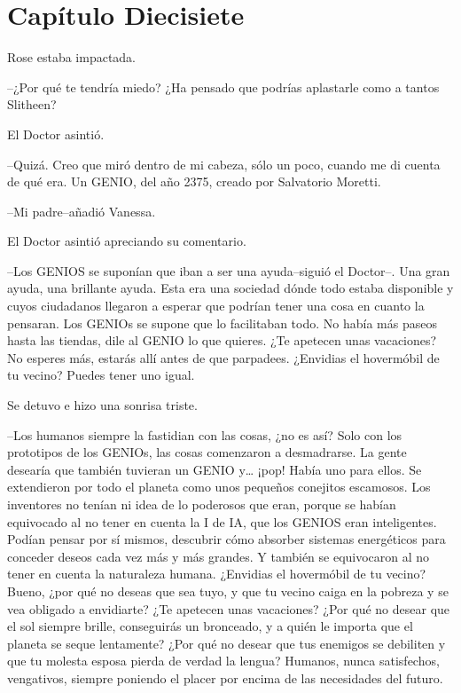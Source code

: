 \chapter*{Capítulo Diecisiete}

Rose estaba impactada.

--¿Por qué te tendría miedo? ¿Ha pensado que podrías aplastarle como a
tantos Slitheen?

El Doctor asintió.

--Quizá. Creo que miró dentro de mi cabeza, sólo un poco, cuando me di
cuenta de qué era. Un GENIO, del año 2375, creado por Salvatorio
Moretti.

--Mi padre--añadió Vanessa.

El Doctor asintió apreciando su comentario.

--Los GENIOS se suponían que iban a ser una ayuda--siguió el Doctor--.
Una gran ayuda, una brillante ayuda. Esta era una sociedad dónde todo
estaba disponible y cuyos ciudadanos llegaron a esperar que podrían
tener una cosa en cuanto la pensaran. Los GENIOs se supone que lo
facilitaban todo. No había más paseos hasta las tiendas, dile al GENIO
lo que quieres. ¿Te apetecen unas vacaciones? No esperes más, estarás
allí antes de que parpadees. ¿Envidias el hovermóbil de tu vecino?
Puedes tener uno igual.

Se detuvo e hizo una sonrisa triste.

--Los humanos siempre la fastidian con las cosas, ¿no es así? Solo con
los prototipos de los GENIOs, las cosas comenzaron a desmadrarse. La
gente desearía que también tuvieran un GENIO y\ldots{} ¡pop! Había uno
para ellos. Se extendieron por todo el planeta como unos pequeños
conejitos escamosos. Los inventores no tenían ni idea de lo poderosos
que eran, porque se habían equivocado al no tener en cuenta la I de IA,
que los GENIOS eran inteligentes. Podían pensar por sí mismos, descubrir
cómo absorber sistemas energéticos para conceder deseos cada vez más y
más grandes. Y también se equivocaron al no tener en cuenta la
naturaleza humana. ¿Envidias el hovermóbil de tu vecino? Bueno, ¿por qué
no deseas que sea tuyo, y que tu vecino caiga en la pobreza y se vea
obligado a envidiarte? ¿Te apetecen unas vacaciones? ¿Por qué no desear
que el sol siempre brille, conseguirás un bronceado, y a quién le
importa que el planeta se seque lentamente? ¿Por qué no desear que tus
enemigos se debiliten y que tu molesta esposa pierda de verdad la
lengua? Humanos, nunca satisfechos, vengativos, siempre poniendo el
placer por encima de las necesidades del futuro.

